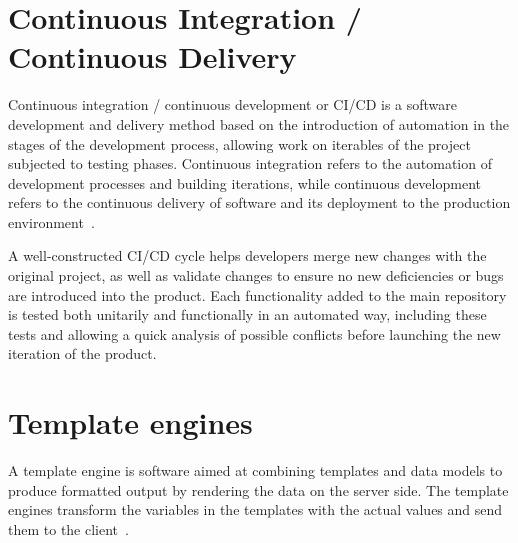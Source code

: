 \section{Continuous Integration / Continuous Delivery}

\nonzeroparskip Continuous integration / continuous development or CI/CD is a software development and delivery method based on the introduction of automation in the stages of the development process, allowing work on iterables of the project subjected to testing phases. Continuous integration refers to the automation of development processes and building iterations, while continuous development refers to the continuous delivery of software and its deployment to the production environment~\cite{redhat_cicd}.

\nonzeroparskip A well-constructed CI/CD cycle helps developers merge new changes with the original project, as well as validate changes to ensure no new deficiencies or bugs are introduced into the product. Each functionality added to the main repository is tested both unitarily and functionally in an automated way, including these tests and allowing a quick analysis of possible conflicts before launching the new iteration of the product.

\section{Template engines}

\nonzeroparskip A template engine is software aimed at combining templates and data models to produce formatted output by rendering the data on the server side. The template engines transform the variables in the templates with the actual values and send them to the client~\cite{template_engines}.